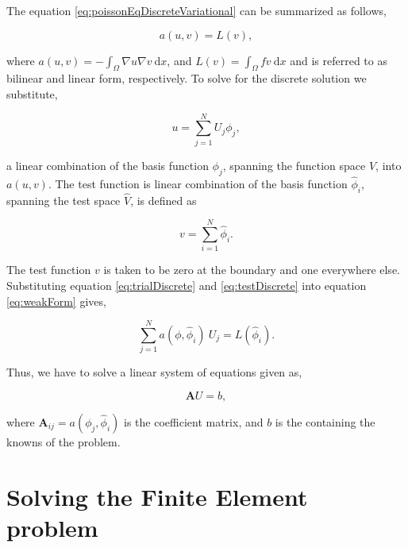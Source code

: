 The equation \ref{eq:poissonEqDiscreteVariational} can be summarized as follows,

	\begin{equation}
	a\left(u,v\right) = L(v),
	\label{eq:weakForm}
	\end{equation}

where $a\left(u,v\right) = - \int_{\Omega} \nabla u \nabla v\ \mathrm{d}x$, and $L(v)=\int_{\Omega}fv\ \mathrm{d}x$ and is referred to as bilinear and linear form, respectively. To solve for the discrete solution we substitute,
	
	\begin{equation}
	u = \sum_{j=1}^{N} U_j \phi_j,
	\label{eq:trialDiscrete}
	\end{equation}

a linear combination of the basis function $\phi_j$, spanning the function space $V$, into $a\left(u,v\right)$. The test function is linear combination of the basis function $\hat{\phi}_i$, spanning the test space $\hat{V}$, is defined as

	\begin{equation}
	v=\sum_{i=1}^{N} \hat{\phi}_i.
	\label{eq:testDiscrete}
	\end{equation}
	
The test function $v$ is taken to be zero at the boundary and one everywhere else. Substituting equation \ref{eq:trialDiscrete} and \ref{eq:testDiscrete} into equation \ref{eq:weakForm} gives,
	
	\begin{equation}
	\sum_{j=1}^N a(\phi,\hat{\phi}_i)\ U_j = L(\hat{\phi}_i).
	\end{equation}

Thus, we have to solve a linear system of equations given as,

	\begin{equation}
	\mathbf{A}U = b,
	\label{eq:linearSysOfEq}
	\end{equation}	
	
where $\mathbf{A}_{ij} = a(\phi_j,\hat{\phi}_i)$ is the coefficient matrix, and $b$ is the  containing the knowns of the problem.
 	
\section{Solving the Finite Element problem}


